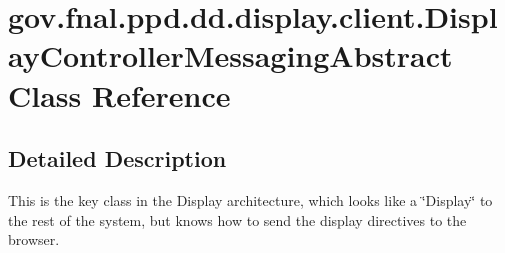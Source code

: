 \hypertarget{classgov_1_1fnal_1_1ppd_1_1dd_1_1display_1_1client_1_1DisplayControllerMessagingAbstract}{\section{gov.\-fnal.\-ppd.\-dd.\-display.\-client.\-Display\-Controller\-Messaging\-Abstract Class Reference}
\label{classgov_1_1fnal_1_1ppd_1_1dd_1_1display_1_1client_1_1DisplayControllerMessagingAbstract}
}


\subsection{Detailed Description}
This is the key class in the Display architecture, which looks like a \char`\"{}\-Display\char`\"{} to the rest of the system, but knows how to send the display directives to the browser. 

